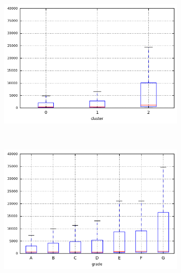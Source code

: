 \begin{anexosenv}
\begin{figure}[t!]
\begin{subfigure}[t]{0.45\textwidth}
            \centerline{\includegraphics[width=1.05\textwidth]{img/last_pymnt_amnt_by_cluster}}
        \end{subfigure}%
        ~ 
        \begin{subfigure}[t]{0.45\textwidth}
            \centering
   
            \centerline{\includegraphics[width=1.05\textwidth]{img/last_pymnt_amnt_by_grade}}

        \end{subfigure}
\\
                \caption{\emph{Boxplots} de total\textunderscore rec\textunderscore prncp }
        \begin{subfigure}[t]{0.45\textwidth}
            \centering


\end{subfigure}
\end{figure}
\end{anexosenv}
